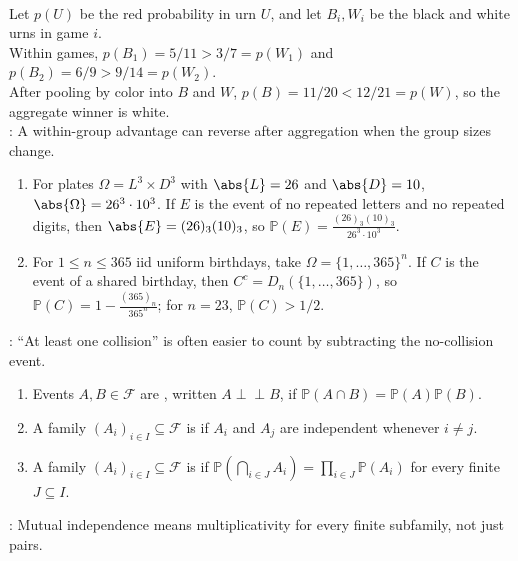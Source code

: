 \begin{example} \label{ex:simpsons-paradox-urn-counting} \\
Let $p(U)$ be the red probability in urn $U$, and let $B_i,W_i$ be the black and white urns in game $i$.\\
Within games, $p(B_1)=5/11>3/7=p(W_1)$ and $p(B_2)=6/9>9/14=p(W_2)$.\\
After pooling by color into $B$ and $W$, $p(B)=11/20<12/21=p(W)$, so the aggregate winner is white.\\
: A within-group advantage can reverse after aggregation when the group sizes change.
\end{example}

\begin{example} \label{ex:license-plates-and-birthday-complement} 
\begin{enumerate}[label=(\roman*)]
\setlength{\itemsep}{0pt}
\item For plates $\Omega=L^3\times D^3$ with $\abs{L}=26$ and $\abs{D}=10$, $\abs{\Omega}=26^3\cdot10^3$. If $E$ is the event of no repeated letters and no repeated digits, then $\abs{E}=(26)_3(10)_3$, so $\mathbb{P}(E)=\frac{(26)_3(10)_3}{26^3\cdot10^3}$.
\item For $1\leq n\leq365$ iid uniform birthdays, take $\Omega=\{1,\ldots,365\}^n$. If $C$ is the event of a shared birthday, then $C^c=D_n(\{1,\ldots,365\})$, so $\mathbb{P}(C)=1-\frac{(365)_n}{365^n}$; for $n=23$, $\mathbb{P}(C)>1/2$.
\end{enumerate}
: ``At least one collision'' is often easier to count by subtracting the no-collision event.
\end{example}

\begin{definition} \label{def:independent-events-and-families} 
\begin{enumerate}[label=(\roman*)]
\setlength{\itemsep}{0pt}
\item Events $A,B\in\mathcal{F}$ are , written $A\perp\!\!\!\perp B$, if $\mathbb{P}(A\cap B)=\mathbb{P}(A)\mathbb{P}(B)$.
\item A family $(A_i)_{i\in I}\subseteq\mathcal{F}$ is  if $A_i$ and $A_j$ are independent whenever $i\neq j$.
\item A family $(A_i)_{i\in I}\subseteq\mathcal{F}$ is  if $\mathbb{P}(\bigcap\limits_{i\in J}A_i)=\prod\limits_{i\in J}\mathbb{P}(A_i)$ for every finite $J\subseteq I$.
\end{enumerate}
: Mutual independence means multiplicativity for every finite subfamily, not just pairs.
\end{definition}

